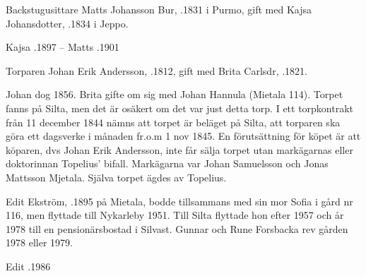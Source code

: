 Backstugusittare Matts Johansson Bur, .1831 i Purmo, gift med Kajsa Johansdotter, .1834 i Jeppo.
\begin{jhchildren}
  \item {}
  \item {}
  \item {}
  \item {}
  \item {}
\end{jhchildren}

Kajsa .1897  --  Matts .1901


Torparen Johan Erik Andersson,  .1812, gift med Brita Carlsdr, .1821.
\begin{jhchildren}
  \item {}
  \item {}
  \item {}
\end{jhchildren}
Johan dog 1856. Brita gifte om sig med Johan Hannula (Mietala 114). Torpet fanns på Silta, men det är osäkert om det var just detta torp. I ett torpkontrakt från 11 december 1844 nämns att torpet är beläget på Silta, att torparen ska göra ett dagsverke i månaden fr.o.m 1 nov 1845. En förutsättning för köpet är att köparen, dvs Johan Erik Andersson, inte får sälja torpet utan markägarnas eller doktorinnan Topelius' bifall. Markägarna var Johan Samuelsson och Jonas Mattsson Mjetala. Själva torpet ägdes av Topelius.




Edit Ekström, .1895 på Mietala, bodde tillsammans med sin mor Sofia i gård nr 116, men flyttade till Nykarleby 1951. Till Silta flyttade hon efter 1957 och år 1978 till en pensionärsbostad i Silvast. Gunnar och Rune Forsbacka rev gården 1978 eller 1979.

Edit .1986

